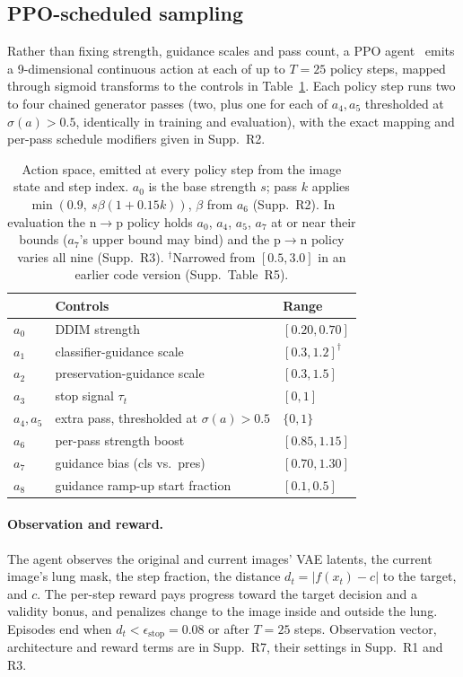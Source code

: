 \subsection{PPO-scheduled sampling}
\label{sec:ppo-sampling}

Rather than fixing strength, guidance scales and pass count, a PPO agent~\cite{schulman2017proximal} emits a 9-dimensional continuous action at each of up to $T=25$ policy steps, mapped through sigmoid transforms to the controls in Table~\ref{tab:action-space}. Each policy step runs two to four chained generator passes (two, plus one for each of $a_4, a_5$ thresholded at $\sigma(a) > 0.5$, identically in training and evaluation), with the exact mapping and per-pass schedule modifiers given in Supp.~R2.

\begin{table}[t]
\centering
\caption{Action space, emitted at every policy step from the image state and step index. $a_0$ is the base strength $s$; pass $k$ applies $\min(0.9,\ s\beta(1 + 0.15k))$, $\beta$ from $a_6$ (Supp.~R2). In evaluation the n$\to$p policy holds $a_0$, $a_4$, $a_5$, $a_7$ at or near their bounds ($a_7$'s upper bound may bind) and the p$\to$n policy varies all nine (Supp.~R3). $^{\dagger}$Narrowed from $[0.5, 3.0]$ in an earlier code version (Supp.~Table~R5).}
\label{tab:action-space}
\small
\begin{tabular}{@{}lll@{}}
\toprule
& Controls & Range \\
\midrule
$a_0$ & DDIM strength & $[0.20, 0.70]$ \\
$a_1$ & classifier-guidance scale & $[0.3, 1.2]^{\dagger}$ \\
$a_2$ & preservation-guidance scale & $[0.3, 1.5]$ \\
$a_3$ & stop signal $\tau_t$ & $[0, 1]$ \\
$a_4, a_5$ & extra pass, thresholded at $\sigma(a) > 0.5$ & $\{0, 1\}$ \\
$a_6$ & per-pass strength boost & $[0.85, 1.15]$ \\
$a_7$ & guidance bias (cls vs.\ pres) & $[0.70, 1.30]$ \\
$a_8$ & guidance ramp-up start fraction & $[0.1, 0.5]$ \\
\bottomrule
\end{tabular}
\end{table}

\paragraph{Observation and reward.} The agent observes the original and current images' VAE latents, the current image's lung mask, the step fraction, the distance $d_t = |f(x_t) - c|$ to the target, and $c$. The per-step reward pays progress toward the target decision and a validity bonus, and penalizes change to the image inside and outside the lung. Episodes end when $d_t < \epsilon_{\text{stop}} = 0.08$ or after $T = 25$ steps. Observation vector, architecture and reward terms are in Supp.~R7, their settings in Supp.~R1 and R3.

